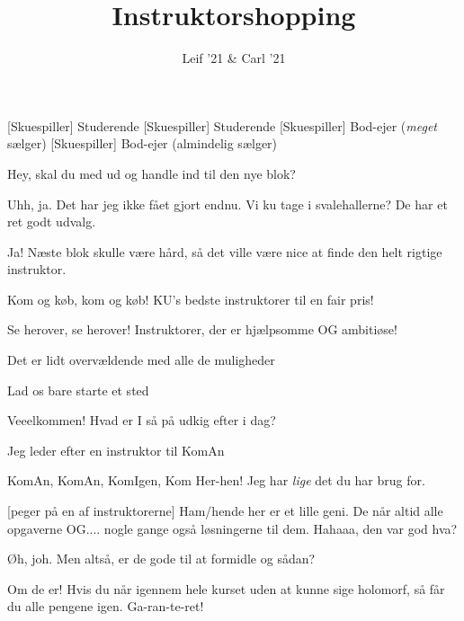 \documentclass[a4paper,11pt]{article}
\title{Instruktorshopping}
\author{Leif '21 \& Carl '21}
\begin{document}
\maketitle

\begin{roles}
[Skuespiller] Studerende
[Skuespiller] Studerende
[Skuespiller] Bod-ejer (\textit{meget} sælger)
[Skuespiller] Bod-ejer (almindelig sælger)
\end{roles}

\begin{props}
\item 
\end{props}


\begin{sketch}

 Hey, skal du med ud og handle ind til den nye blok? 

 Uhh, ja. Det har jeg ikke fået gjort endnu. Vi ku tage i svalehallerne? De har et ret godt udvalg.

 Ja! Næste blok skulle være hård, så det ville være nice at finde den helt rigtige instruktor. 


 Kom og køb, kom og køb! KU's bedste instruktorer til en fair pris!

 Se herover, se herover! Instruktorer, der er hjælpsomme OG ambitiøse!

 Det er lidt overvældende med alle de muligheder

 Lad os bare starte et sted


 Veeelkommen! Hvad er I så på udkig efter i dag?

 Jeg leder efter en instruktor til KomAn

 KomAn, KomAn, KomIgen, Kom Her-hen! Jeg har \textit{lige} det du har brug for. 

[peger på en af instruktorerne] Ham/hende her er et lille geni. De når altid alle opgaverne OG.... nogle gange også løsningerne til dem. Hahaaa, den var god hva? 

 Øh, joh. Men altså, er de gode til at formidle og sådan?

 Om de er! Hvis du når igennem hele kurset uden at kunne sige holomorf, så får du alle pengene igen. Ga-ran-te-ret!


\end{sketch}
\end{document}
